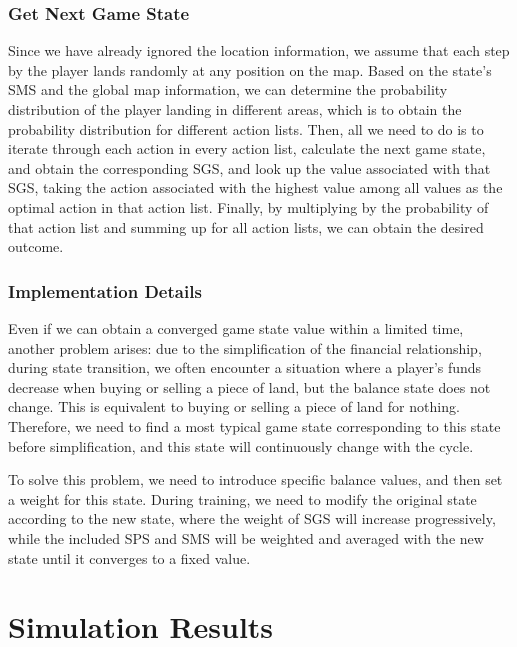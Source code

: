 \documentclass{article}
\begin{document}
\subsubsection{Get Next Game State}
    Since we have already ignored the location information, we assume that each step by the player lands randomly at any position on the map. Based on the state's SMS and the global map information, we can determine the probability distribution of the player landing in different areas, which is to obtain the probability distribution for different action lists. Then, all we need to do is to iterate through each action in every action list, calculate the next game state, and obtain the corresponding SGS, and look up the value associated with that SGS, taking the action associated with the highest value among all values as the optimal action in that action list. Finally, by multiplying by the probability of that action list and summing up for all action lists, we can obtain the desired outcome.


\subsubsection{Implementation Details}
    Even if we can obtain a converged game state value within a limited time, another problem arises: due to the simplification of the financial relationship, during state transition, we often encounter a situation where a player's funds decrease when buying or selling a piece of land, but the balance state does not change. This is equivalent to buying or selling a piece of land for nothing. Therefore, we need to find a most typical game state corresponding to this state before simplification, and this state will continuously change with the cycle.
    
    To solve this problem, we need to introduce specific balance values, and then set a weight for this state. During training, we need to modify the original state according to the new state, where the weight of SGS will increase progressively, while the included SPS and SMS will be weighted and averaged with the new state until it converges to a fixed value.


\section{Simulation Results}
\end{document}
